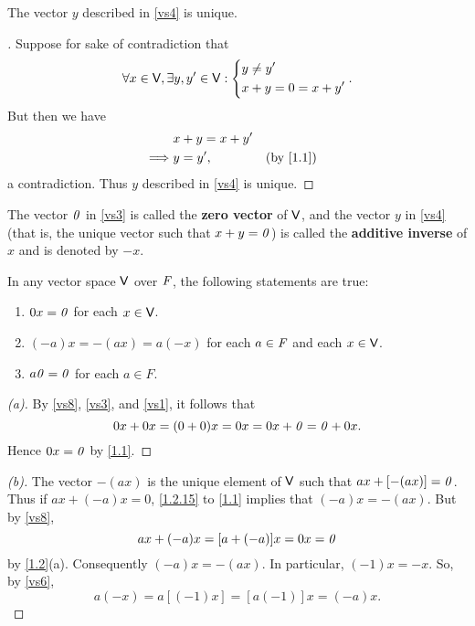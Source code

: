 \begin{cor}\label{1.2.15}
	The vector \(y\) described in \ref{vs4} is unique.
\end{cor}

\begin{proof}[]
	Suppose for sake of contradiction that
	\[
		\forall x \in \mathsf{V}, \exists y, y' \in \mathsf{V} : \begin{dcases}
			y \neq y' \\
			x + y = 0 = x + y'
		\end{dcases}.
	\]
	But then we have
	\begin{align*}
		         & x + y = x + y'                             \\
		\implies & y = y',        &  & \text{(by \cref{1.1})}
	\end{align*}
	a contradiction.
	Thus \(y\) described in \ref{vs4} is unique.
\end{proof}

\begin{defn}\label{1.2.16}
	The vector \(\mathit{0}\) in \ref{vs3} is called the \textbf{zero vector} of \(\mathsf{V}\), and the vector \(y\) in \ref{vs4} (that is, the unique vector such that \(x + y = \mathit{0}\)) is called the \textbf{additive inverse} of \(x\) and is denoted by \(-x\).
\end{defn}

\begin{thm}\label{1.2}
	In any vector space \(\mathsf{V}\) over \(\mathit{F}\), the following statements are true:
	\begin{enumerate}
		\item \(0x = \mathit{0}\) for each \(x \in \mathsf{V}\).
		\item \((-a)x = -(ax) = a(-x)\) for each \(a \in \mathit{F}\) and each \(x \in \mathsf{V}\).
		\item \(a\mathit{0} = \mathit{0}\) for each \(a \in F\).
	\end{enumerate}
\end{thm}

\begin{proof}[(a)]
	By \ref{vs8}, \ref{vs3}, and \ref{vs1}, it follows that
	\[
		0x + 0x = (0 + 0) x = 0x = 0x + \mathit{0} = \mathit{0} + 0x.
	\]
	Hence \(0x = \mathit{0}\) by \cref{1.1}.
\end{proof}

\begin{proof}[(b)]
	The vector \(-(ax)\) is the unique element of \(\mathsf{V}\) such that \(ax + [-(ax)] = \mathit{0}\).
	Thus if \(ax + (-a)x = 0\), \cref{1.2.15} to \cref{1.1} implies that \((-a)x = -(ax)\).
	But by \ref{vs8},
	\[
		ax + (-a)x = [a + (-a)]x = 0x = \mathit{0}
	\]
	by \cref{1.2}(a).
	Consequently \((-a)x = -(ax)\).
	In particular, \((-1)x = -x\).
	So, by \ref{vs6},
	\[
		a(-x) = a[(-1)x] = [a(-1)]x = (-a)x.
	\]
\end{proof}

